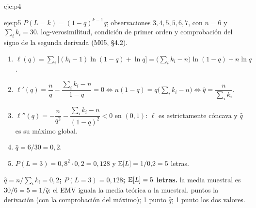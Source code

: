 \begin{solucion}{eje:p4}
\end{solucion}

\begin{solucion}{eje:p5}
\datos $P(L=k)=(1-q)^{k-1}q$; observaciones $3,4,5,5,6,7$, con $n=6$ y $\sum_ik_i=30$.
\planteamiento log-verosimilitud, condición de primer orden y comprobación del signo de la segunda derivada (M05, §4.2).
\pasos
\begin{enumerate}[label=\arabic*.]
  \item $\ell(q)=\sum_i\big[(k_i-1)\ln(1-q)+\ln q\big]=\big(\sum_ik_i-n\big)\ln(1-q)+n\ln q$.
  \item $\ell'(q)=\dfrac nq-\dfrac{\sum_ik_i-n}{1-q}=0\iff n(1-q)=q\big(\sum_ik_i-n\big)\iff\hat q=\dfrac{n}{\sum_ik_i}$.
  \item $\ell''(q)=-\dfrac n{q^{2}}-\dfrac{\sum_ik_i-n}{(1-q)^{2}}<0$ en $(0,1)$: $\ell$ es estrictamente cóncava y $\hat q$ es su máximo global.
  \item $\hat q=6/30=0{,}2$.
  \item $P(L=3)=0{,}8^{2}\cdot0{,}2=0{,}128$ y $\mathbb{E}[L]=1/0{,}2=5$ letras.
\end{enumerate}
\resultado \textbf{$\hat q=n/\sum_ik_i=0{,}2$; $P(L=3)=0{,}128$; $\mathbb{E}[L]=5$ letras.}
\comprobacion la media muestral es $30/6=5=1/\hat q$: el EMV iguala la media teórica a la muestral.
 puntos la derivación (con la comprobación del máximo); 1 punto $\hat q$; 1 punto los dos valores.


\end{solucion}
